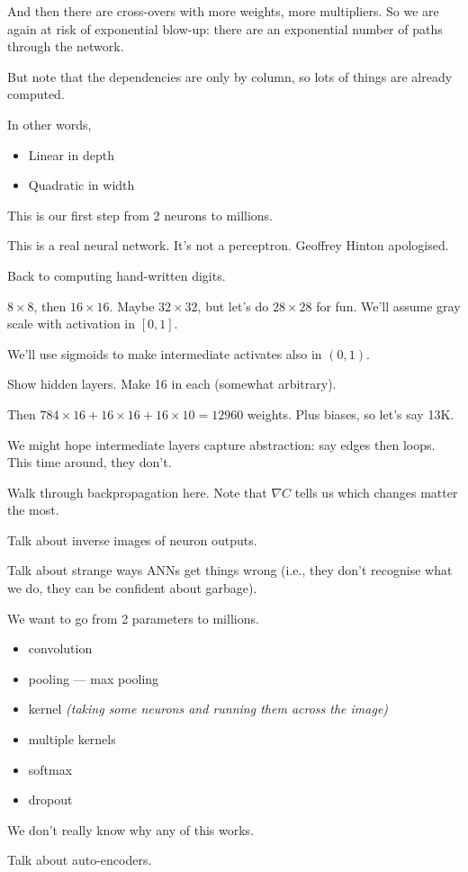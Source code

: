 

And then there are cross-overs with more weights, more multipliers.
So we are again at risk of exponential blow-up: there are an
exponential number of paths through the network.

But note that the dependencies are only by column, so lots of things
are already computed.

In other words,
\begin{itemize}
\item Linear in depth
\item Quadratic in width
\end{itemize}



This is our first step from 2 neurons to millions.

This is a real neural network.  It's not a perceptron.  Geoffrey Hinton apologised.

Back to computing hand-written digits.

$8\times 8$, then $16\times 16$.  Maybe $32\times 32$, but let's do
$28\times 28$ for fun.  We'll assume gray scale with activation in
$[0,1]$.

We'll use sigmoids to make intermediate activates also in $(0,1)$.

Show hidden layers.  Make 16 in each (somewhat arbitrary).

Then $784\times 16 + 16\times 16 + 16 \times 10 = 12960$ weights.
Plus biases, so let's say 13K.

We might hope intermediate layers capture abstraction: say edges then
loops.  This time around, they don't.

Walk through backpropagation here.  Note that $\nabla C$ tells us
which changes matter the most.

Talk about inverse images of neuron outputs.

Talk about strange ways ANNs get things wrong (i.e., they don't
recognise what we do, they can be confident about garbage).




We want to go from 2 parameters to millions.

\begin{itemize}
\item convolution
\item pooling --- max pooling
\item kernel \textit{(taking some neurons and running them across the image)}
\item multiple kernels
\item softmax
\item dropout
\end{itemize}

We don't really know why any of this works.

Talk about auto-encoders.


